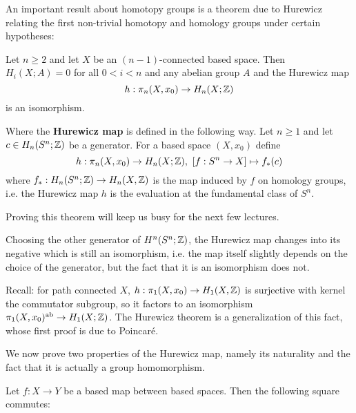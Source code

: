 An important result about homotopy groups is a theorem due to Hurewicz relating the first non-trivial homotopy and homology groups under certain hypotheses:

\begin{theorem}[Hurewicz]\label{theorem:absolute-hurewicz}
Let $n\geq2$ and let $X$ be an $(n-1)$-connected based space. Then $H_i(X;A)=0$ for all $0<i<n$ and any abelian group $A$ and the Hurewicz map
\[h:\pi_n(X,x_0)\to H_n(X;{\mathbb Z})\]
is an isomorphism.
\end{theorem}

Where the \textbf{Hurewicz map} is defined in the following way. Let $n\geq1$ and let $c\in H_n(S^n;{\mathbb Z})$ be a generator. For a based space $(X,x_0)$ define
\[h:\pi_n(X,x_0)\to H_n(X;\Z),\ [f:S^n\to X]\mapsto f_*(c)\]
where $f_*:H_n(S^n;{\mathbb Z})\to H_n(X,{\mathbb Z})$ is the map induced by $f$ on homology groups, i.e. the Hurewicz map $h$ is the evaluation at the fundamental class of $S^n$.

Proving this theorem will keep us busy for the next few lectures.

\begin{remark}
Choosing the other generator of $H^n(S^n;{\mathbb Z})$, the Hurewicz map changes into its negative which is still an isomorphism, i.e. the map itself slightly depends on the choice of the generator, but the fact that it is an isomorphism does not.
\end{remark}

\begin{remark}
Recall: for path connected $X$, $h:\pi_1(X,x_0)\to H_1(X,{\mathbb Z})$ is surjective with kernel the commutator subgroup, so it factors to an isomorphism $\pi_1(X,x_0)^{\text{ab}}\to H_1(X;{\mathbb Z})$. The Hurewicz theorem is a generalization of this fact, whose first proof is due to Poincaré.
\end{remark}

We now prove two properties of the Hurewicz map, namely its naturality and the fact that it is actually a group homomorphism.

 Let $f:X\to Y$ be a based map between based spaces. Then the following square commutes:
\begin{center}
\end{center}


